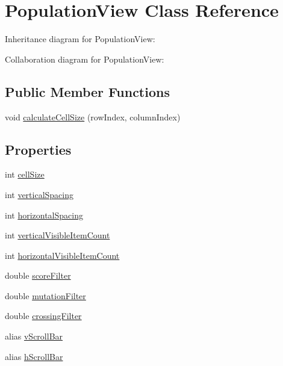 \hypertarget{class_population_view}{}\section{Population\+View Class Reference}
\label{class_population_view}


Inheritance diagram for Population\+View\+:


Collaboration diagram for Population\+View\+:
\subsection*{Public Member Functions}
\begin{DoxyCompactItemize}
\item 
void \hyperlink{class_population_view_ae2224014c990c0270eef8d3e58371a43}{calculate\+Cell\+Size} (row\+Index, column\+Index)
\end{DoxyCompactItemize}
\subsection*{Properties}
\begin{DoxyCompactItemize}
\item 
int \hyperlink{class_population_view_ac51944cd0ca1aa11638354eb2bd97634}{cell\+Size}
\item 
int \hyperlink{class_population_view_a2ed2b9db4c8e806fc77c2af6fb9fa164}{vertical\+Spacing}
\item 
int \hyperlink{class_population_view_ab474777ee7d05874f0454ba4a2dbb715}{horizontal\+Spacing}
\item 
int \hyperlink{class_population_view_ac7ecf41c43f3636ca4c155beea54b580}{vertical\+Visible\+Item\+Count}
\item 
int \hyperlink{class_population_view_a4fa7612ac84c844411e316609b566181}{horizontal\+Visible\+Item\+Count}
\item 
double \hyperlink{class_population_view_a4153a853e704b553c0e8dcd7ca9dbd2e}{score\+Filter}
\item 
double \hyperlink{class_population_view_a3a173e593c94e3aa1b04b7e60c914c58}{mutation\+Filter}
\item 
double \hyperlink{class_population_view_a92ef25d9785e89ae586e0e574526faa9}{crossing\+Filter}
\item 
alias \hyperlink{class_population_view_a861743ff60207556fdb76b7cb8f9f8fe}{v\+Scroll\+Bar}
\item 
alias \hyperlink{class_population_view_a5a94c9d7afc5b9ae98fba25d0951f4c0}{h\+Scroll\+Bar}
\end{DoxyCompactItemize}


